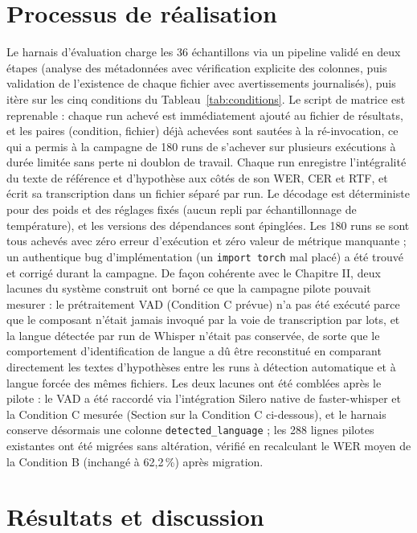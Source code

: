 \documentclass[12pt]{report}
\begin{document}
\section{Processus de réalisation}
Le harnais d'évaluation charge les 36 échantillons via un pipeline validé en deux étapes (analyse des métadonnées avec vérification explicite des colonnes, puis validation de l'existence de chaque fichier avec avertissements journalisés), puis itère sur les cinq conditions du Tableau~\ref{tab:conditions}. Le script de matrice est reprenable : chaque run achevé est immédiatement ajouté au fichier de résultats, et les paires (condition, fichier) déjà achevées sont sautées à la ré-invocation, ce qui a permis à la campagne de 180 runs de s'achever sur plusieurs exécutions à durée limitée sans perte ni doublon de travail. Chaque run enregistre l'intégralité du texte de référence et d'hypothèse aux côtés de son WER, CER et RTF, et écrit sa transcription dans un fichier séparé par run. Le décodage est déterministe pour des poids et des réglages fixés (aucun repli par échantillonnage de température), et les versions des dépendances sont épinglées. Les 180 runs se sont tous achevés avec zéro erreur d'exécution et zéro valeur de métrique manquante ; un authentique bug d'implémentation (un \texttt{import torch} mal placé) a été trouvé et corrigé durant la campagne.
De façon cohérente avec le Chapitre II, deux lacunes du système construit ont borné ce que la campagne pilote pouvait mesurer : le prétraitement VAD (Condition C prévue) n'a pas été exécuté parce que le composant n'était jamais invoqué par la voie de transcription par lots, et la langue détectée par run de Whisper n'était pas conservée, de sorte que le comportement d'identification de langue a dû être reconstitué en comparant directement les textes d'hypothèses entre les runs à détection automatique et à langue forcée des mêmes fichiers. Les deux lacunes ont été comblées après le pilote : le VAD a été raccordé via l'intégration Silero native de faster-whisper et la Condition C mesurée (Section sur la Condition C ci-dessous), et le harnais conserve désormais une colonne \texttt{detected\_language} ; les 288 lignes pilotes existantes ont été migrées sans altération, vérifié en recalculant le WER moyen de la Condition B (inchangé à 62,2\,\%) après migration.
\section{Résultats et discussion}
\end{document}
